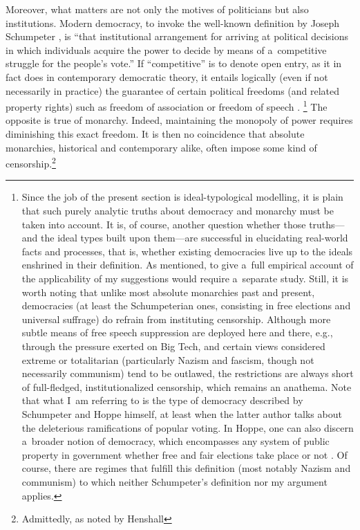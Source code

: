 Moreover, what matters are not only the motives of politicians but also institutions. Modern democracy, to invoke the well-known definition by Joseph Schumpeter 
\parencite*[][p.269]{schumpeter_capitalism_2006}, %
 is ``that institutional arrangement for arriving at political decisions in which individuals acquire the power to decide by means of a~competitive struggle for the people's vote.'' If ``competitive'' is to denote open entry, as it in fact does in contemporary democratic theory, it entails logically (even if not necessarily in practice) the guarantee of certain political freedoms (and related property rights) such as freedom of association or freedom of speech 
\parencites[][]{dahl_democracy_1989}[][pp.13–14]{tilly_democracy_2007}.%
\footnote{Since the job of the present section is ideal-typological modelling, it is plain that such purely analytic truths about democracy and monarchy must be taken into account. It is, of course, another question whether those truths---and the ideal types built upon them---are successful in elucidating real-world facts and processes, that is, whether existing democracies live up to the ideals enshrined in their definition. As mentioned, to give a~full empirical account of the applicability of my suggestions would require a~separate study. Still, it is worth noting that unlike most absolute monarchies past and present, democracies (at least the Schumpeterian ones, consisting in free elections and universal suffrage) do refrain from instituting censorship. Although more subtle means of free speech suppression are deployed here and there, e.g., through the pressure exerted on Big Tech, and certain views considered extreme or totalitarian (particularly Nazism and fascism, though not necessarily communism) tend to be outlawed, the restrictions are always short of full-fledged, institutionalized censorship, which remains an anathema. Note that what I~am referring to is the type of democracy described by Schumpeter and Hoppe himself, at least when the latter author talks about the deleterious ramifications of popular voting. In Hoppe, one can also discern a~broader notion of democracy, which encompasses any system of public property in government whether free and fair elections take place or not 
\parencite[][]{nowakowski_dlaczego_2010}. %
 Of course, there are regimes that fulfill this definition (most notably Nazism and communism) to which neither Schumpeter's definition nor my argument applies. } The opposite is true of monarchy. Indeed, maintaining the monopoly of power requires diminishing this exact freedom. It is then no coincidence that absolute monarchies, historical and contemporary alike, often impose some kind of censorship.\footnote{Admittedly, as noted by Henshall 
}
